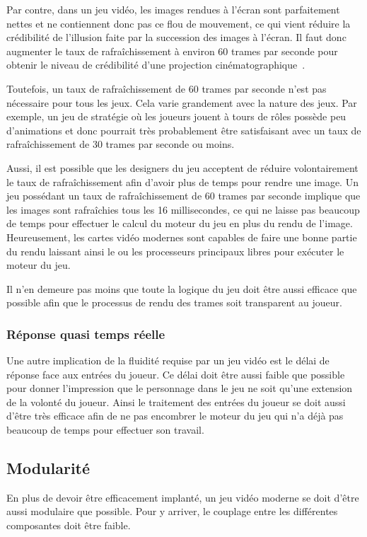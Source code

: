 \documentclass[12pt,twoside,letterpaper,francais]{book}
\begin{document}
Par contre, dans un jeu vidéo, les images rendues à l'écran sont
parfaitement nettes et ne contiennent donc pas ce flou de mouvement,
ce qui vient réduire la crédibilité de l'illusion faite par la
succession des images à l'écran. Il faut donc augmenter le taux de
rafraîchissement à environ 60 trames par seconde pour obtenir le
niveau de crédibilité d'une projection
cinématographique~\cite{30vs60}.

Toutefois, un taux de rafraîchissement de 60 trames par seconde n'est
pas nécessaire pour tous les jeux. Cela varie grandement avec la
nature des jeux. Par exemple, un jeu de stratégie où les joueurs
jouent à tours de rôles possède peu d'animations et donc pourrait très
probablement être satisfaisant avec un taux de rafraîchissement de 30
trames par seconde ou moins.

Aussi, il est possible que les designers du jeu acceptent de réduire
volontairement le taux de rafraîchissement afin d'avoir plus de temps
pour rendre une image. Un jeu possédant un taux de rafraîchissement de
60 trames par seconde implique que les images sont rafraîchies tous
les 16 millisecondes, ce qui ne laisse pas beaucoup de temps pour
effectuer le calcul du moteur du jeu en plus du rendu de
l'image. Heureusement, les cartes vidéo modernes sont capables de
faire une bonne partie du rendu laissant ainsi le ou les processeurs
principaux libres pour exécuter le moteur du jeu.

Il n'en demeure pas moins que toute la logique du jeu doit être aussi
efficace que possible afin que le processus de rendu des trames soit
transparent au joueur.

\FloatBarrier
\subsubsection{Réponse quasi temps réelle}
Une autre implication de la fluidité requise par un jeu vidéo est le
délai de réponse face aux entrées du joueur. Ce délai doit être aussi
faible que possible pour donner l'impression que le personnage dans le
jeu ne soit qu'une extension de la volonté du joueur. Ainsi le
traitement des entrées du joueur se doit aussi d'être très efficace
afin de ne pas encombrer le moteur du jeu qui n'a déjà pas beaucoup de
temps pour effectuer son travail.

\FloatBarrier
\subsection{Modularité}
En plus de devoir être efficacement implanté, un jeu vidéo moderne se
doit d'être aussi modulaire que possible. Pour y arriver, le couplage
entre les différentes composantes doit être faible.
\end{document}
